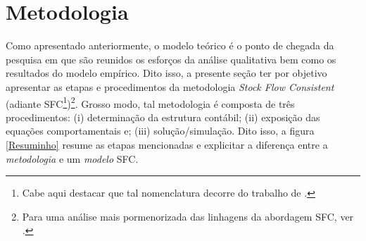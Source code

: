 \section{Metodologia}\label{passos}

Como apresentado anteriormente, o modelo teórico é o ponto de chegada da pesquisa em que são reunidos os esforços da análise qualitativa bem como os resultados do modelo empírico. Dito isso, a presente seção ter por objetivo apresentar as etapas e procedimentos da metodologia \textit{Stock Flow Consistent} (adiante SFC\footnote{Cabe aqui destacar que tal nomenclatura decorre do trabalho de \textcite{dos_santos_keynesian_2006}.})\footnote{Para uma análise mais pormenorizada das linhagens da abordagem SFC, ver \textcite{caverzasi_stock-flow_2013}.}. Grosso modo, tal metodologia é composta de três procedimentos: (i) determinação da estrutura contábil; (ii) exposição das equações comportamentais e; (iii) solução/simulação. Dito isso, a figura \ref{Resuminho} resume as etapas mencionadas e explicitar a diferença entre a \textit{metodologia} e um \textit{modelo} SFC. 

